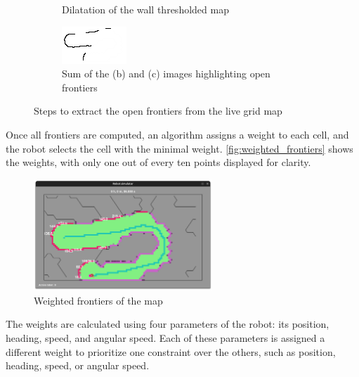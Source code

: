 \documentclass[../main.tex]{subfiles}
\begin{document}
\begin{figure}[H]
\begin{subfigure}[b]{0.45\textwidth}
		\caption{Dilatation of the wall thresholded map}
		\label{fig:subfigure3}
	\end{subfigure}
	\hfill
	\begin{subfigure}[b]{0.45\textwidth}
		\centering
		\includegraphics[width=\textwidth]{IMAGES/part3/sum_image.png}
		\caption{Sum of the (b) and (c) images highlighting open frontiers}
		\label{fig:subfigure4}
	\end{subfigure}
	\caption{Steps to extract the open frontiers from the live grid map}
	\label{fig:open_frontiers}
\end{figure}

Once all frontiers are computed, an algorithm assigns a weight to each cell, and the robot selects the cell with the minimal weight. \autoref{fig:weighted_frontiers} shows the weights, with only one out of every ten points displayed for clarity.

\begin{figure}[H]
	\centering
	\includegraphics[width=0.6\textwidth]{IMAGES/part3/weighted_fontiers.png}
	\caption{Weighted frontiers of the map}
	\label{fig:weighted_frontiers}
\end{figure}

The weights are calculated using four parameters of the robot: its position, heading, speed, and angular speed. Each of these parameters is assigned a different weight to prioritize one constraint over the others, such as position, heading, speed, or angular speed.
\end{document}
